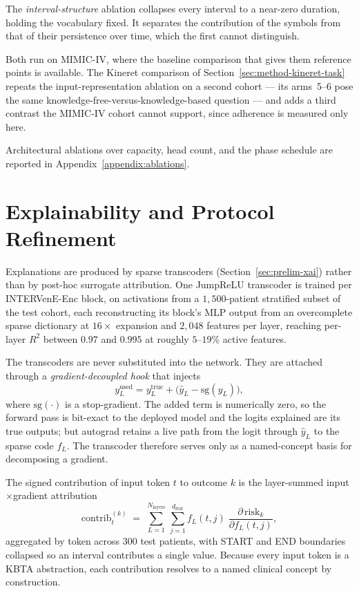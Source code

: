 The \emph{interval-structure} ablation collapses every interval to a near-zero duration, holding the vocabulary fixed. It separates the contribution of the symbols from that of their persistence over time, which the first cannot distinguish.

Both run on MIMIC-IV, where the baseline comparison that gives them reference points is available. The Kineret comparison of Section~\ref{sec:method-kineret-task} repeats the input-representation ablation on a second cohort --- its arms~5--6 pose the same knowledge-free-versus-knowledge-based question --- and adds a third contrast the MIMIC-IV cohort cannot support, since adherence is measured only here.

Architectural ablations over capacity, head count, and the phase schedule are reported in Appendix~\ref{appendix:ablations}.

\section{Explainability and Protocol Refinement}
\label{sec:evalm-xai}

Explanations are produced by sparse transcoders (Section~\ref{sec:prelim-xai}) rather than by post-hoc surrogate attribution. One JumpReLU transcoder is trained per INTERVenE-Enc block, on activations from a $1{,}500$-patient stratified subset of the test cohort, each reconstructing its block's MLP output from an overcomplete sparse dictionary at $16\times$ expansion and $2{,}048$ features per layer, reaching per-layer $R^2$ between $0.97$ and $0.995$ at roughly $5$--$19\%$ active features.

The transcoders are never substituted into the network. They are attached through a \emph{gradient-decoupled hook} that injects
\begin{equation}
y^{\mathrm{used}}_L = y^{\mathrm{true}}_L + \big(\hat{y}_L - \mathrm{sg}(\hat{y}_L)\big),
\label{eq:gd-hook}
\end{equation}
where $\mathrm{sg}(\cdot)$ is a stop-gradient. The added term is numerically zero, so the forward pass is bit-exact to the deployed model and the logits explained are its true outputs; but autograd retains a live path from the logit through $\hat{y}_L$ to the sparse code $f_L$. The transcoder therefore serves only as a named-concept basis for decomposing a gradient.

The signed contribution of input token $t$ to outcome $k$ is the layer-summed input$\times$gradient attribution
\begin{equation}
\mathrm{contrib}_t^{(k)} \;=\; \sum_{L=1}^{N_{\mathrm{layers}}}\,\sum_{j=1}^{d_{\mathrm{feat}}} f_L(t,j)\;\frac{\partial\,\mathrm{risk}_k}{\partial f_L(t,j)} ,
\label{eq:contrib}
\end{equation}
aggregated by token across $300$ test patients, with START and END boundaries collapsed so an interval contributes a single value. Because every input token is a KBTA abstraction, each contribution resolves to a named clinical concept by construction.

